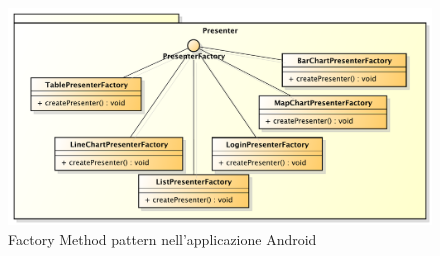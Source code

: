 	    		\begin{figure}[H]\centering
	        		\includegraphics[width=\textwidth]{SpecificaTecnica/Pics/DesignPatternApp/FactoryMethod}
	        		\caption{Factory Method pattern nell'applicazione Android}
	    		\end{figure}

